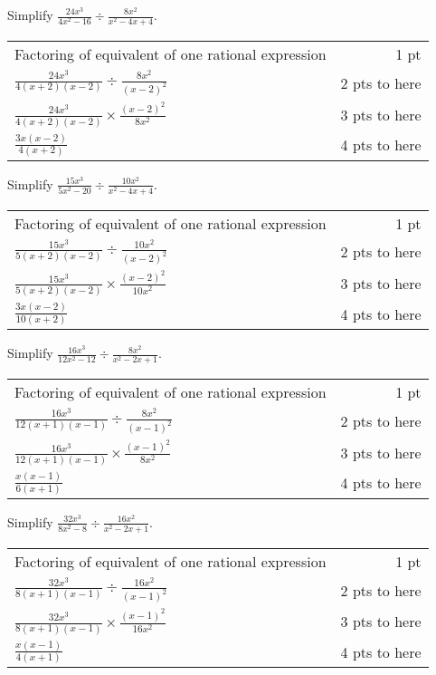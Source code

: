 {
	Simplify $\displaystyle \frac{24x^3}{4x^2-16}\div\frac{8x^2}{x^2-4x+4}$.
}
{
	\begin{tabular}{l r}
	Factoring of equivalent of one rational expression & 1 pt \\
	$\frac{24x^3}{4(x+2)(x-2)} \div \frac{8x^2}{(x-2)^2}$ & 2 pts to here\\
	$\frac{24x^3}{4(x+2)(x-2)} \times \frac{(x-2)^2}{8x^2}$ & 3 pts to here\\
	$\frac{3x(x-2)}{4(x+2)}$ & 4 pts to here
	\end{tabular}
}

{
	Simplify $\displaystyle \frac{15x^3}{5x^2-20}\div\frac{10x^2}{x^2-4x+4}$.
}
{
	\begin{tabular}{l r}
	Factoring of equivalent of one rational expression & 1 pt \\
	$\frac{15x^3}{5(x+2)(x-2)} \div \frac{10x^2}{(x-2)^2}$ & 2 pts to here\\
	$\frac{15x^3}{5(x+2)(x-2)} \times \frac{(x-2)^2}{10x^2}$ & 3 pts to here\\
	$\frac{3x(x-2)}{10(x+2)}$ & 4 pts to here
	\end{tabular}
}

{
	Simplify $\displaystyle \frac{16x^3}{12x^2-12}\div\frac{8x^2}{x^2-2x+1}$.
}
{
	\begin{tabular}{l r}
	Factoring of equivalent of one rational expression & 1 pt \\
	$\frac{16x^3}{12(x+1)(x-1)} \div \frac{8x^2}{(x-1)^2}$ & 2 pts to here\\
	$\frac{16x^3}{12(x+1)(x-1)} \times \frac{(x-1)^2}{8x^2}$ & 3 pts to here\\
	$\frac{x(x-1)}{6(x+1)}$ & 4 pts to here
	\end{tabular}
}

{
	Simplify $\displaystyle \frac{32x^3}{8x^2-8}\div\frac{16x^2}{x^2-2x+1}$.
}
{
	\begin{tabular}{l r}
	Factoring of equivalent of one rational expression & 1 pt \\
	$\frac{32x^3}{8(x+1)(x-1)} \div \frac{16x^2}{(x-1)^2}$ & 2 pts to here\\
	$\frac{32x^3}{8(x+1)(x-1)} \times \frac{(x-1)^2}{16x^2}$ & 3 pts to here\\
	$\frac{x(x-1)}{4(x+1)}$ & 4 pts to here
	\end{tabular}
}
